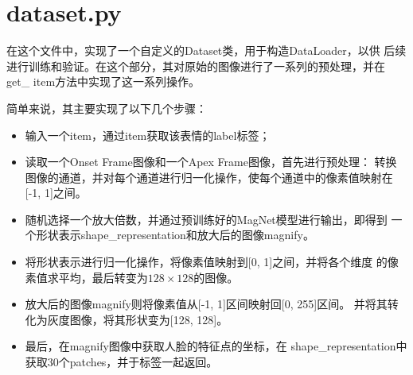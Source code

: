\documentclass[AutoFakeBold]{MyFormat}
\begin{document}
\section{dataset.py}
\par 在这个文件中，实现了一个自定义的Dataset类，用于构造DataLoader，以供
后续进行训练和验证。在这个部分，其对原始的图像进行了一系列的预处理，并在get\_
item方法中实现了这一系列操作。
\par 简单来说，其主要实现了以下几个步骤：
\begin{itemize}
    \item 输入一个item，通过item获取该表情的label标签；
    \item 读取一个Onset Frame图像和一个Apex Frame图像，首先进行预处理：
    转换图像的通道，并对每个通道进行归一化操作，使每个通道中的像素值映射在
    [-1, 1]之间。
    \item 随机选择一个放大倍数，并通过预训练好的MagNet模型进行输出，即得到
    一个形状表示shape\_representation和放大后的图像magnify。
    \item 将形状表示进行归一化操作，将像素值映射到[0, 1]之间，并将各个维度
    的像素值求平均，最后转变为$128\times 128$的图像。
    \item 放大后的图像magnify则将像素值从[-1, 1]区间映射回[0, 255]区间。
    并将其转化为灰度图像，将其形状变为[128, 128]。
    \item 最后，在magnify图像中获取人脸的特征点的坐标，在
    shape\_representation中获取30个patches，并于标签一起返回。
\end{itemize}
\end{document}
